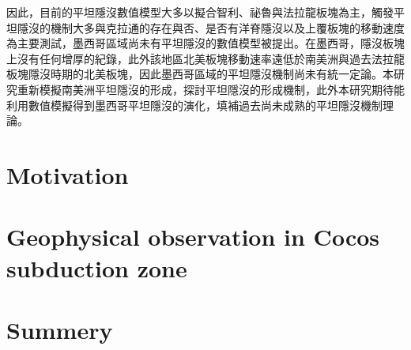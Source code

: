 因此，目前的平坦隱沒數值模型大多以擬合智利、祕魯與法拉龍板塊為主，觸發平坦隱沒的機制大多與克拉通的存在與否、是否有洋脊隱沒以及上覆板塊的移動速度為主要測試，墨西哥區域尚未有平坦隱沒的數值模型被提出。在墨西哥，隱沒板塊上沒有任何增厚的紀錄，此外該地區北美板塊移動速率遠低於南美洲與過去法拉龍板塊隱沒時期的北美板塊，因此墨西哥區域的平坦隱沒機制尚未有統一定論。本研究重新模擬南美洲平坦隱沒的形成，探討平坦隱沒的形成機制，此外本研究期待能利用數值模擬得到墨西哥平坦隱沒的演化，填補過去尚未成熟的平坦隱沒機制理論。


\section{Motivation}

\section{Geophysical observation in Cocos subduction zone}

\section{Summery}
